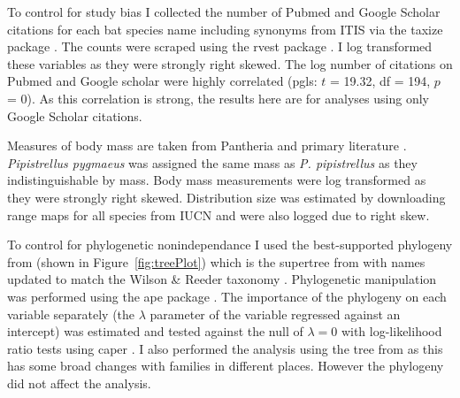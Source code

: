 To control for study bias I collected the number of Pubmed and Google Scholar citations for each bat species name including synonyms from ITIS \cite{itis} via the taxize package \cite{chamberlain2013taxize}.
The counts were scraped using the rvest package \cite{rvest}.
I log transformed these variables as they were strongly right skewed.
The log number of citations on Pubmed and Google scholar were highly correlated (pgls: $t$ = 19.32, df = 194, $p$ = 0).
As this correlation is strong, the results here are for analyses using only Google Scholar citations.

Measures of body mass are taken from Pantheria \cite{jones2009pantheria} and primary literature \cite{canals2005relative, arita1993rarity, lopez2014echolocation, orr2013does, lim2001bat, aldridge1987turning, ma2003dietary, owen2003home, henderson2008movements, heaney2012nyctalus, oleksy2015high, zhang2009recent}. 
\emph{Pipistrellus pygmaeus} was assigned the same mass as \emph{P. pipistrellus} as they indistinguishable by mass.
Body mass measurements were log transformed as they were strongly right skewed.
Distribution size was estimated by downloading range maps for all species from IUCN \cite{iucn} and were also logged due to right skew.


To control for phylogenetic nonindependance I used the best-supported phylogeny from \textcite{fritz2009geographical} (shown in Figure~\ref{fig:treePlot}) which is the supertree from \cite{bininda2007delayed} with names updated to match the Wilson \& Reeder taxonomy \cite{wilson2005mammal}.
Phylogenetic manipulation was performed using the ape package \cite{ape}.
The importance of the phylogeny on each variable separately (the $\lambda$ parameter of the variable regressed against an intercept) was estimated and tested against the null of $\lambda = 0$ with log-likelihood ratio tests using caper \cite{caper}.
I also performed the analysis using the tree from \cite{jones2005bats} as this has some broad changes with families in different places.
However the phylogeny did not affect the analysis.







		
		























